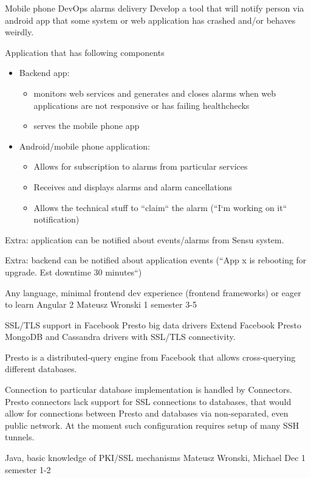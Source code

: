 \begin{project}
{Mobile phone DevOps alarms delivery}
{Develop a tool that will notify person via android app that some system or web application has crashed and/or behaves weirdly.} 
{
Application that has following components
\begin{itemize}
	\item Backend app:
		\begin{itemize}
			\item monitors web services and generates and closes alarms when web applications are not responsive or has failing healthchecks
			\item serves the mobile phone app
		\end{itemize}
	\item Android/mobile phone application:
		\begin{itemize}
			\item Allows for subscription to alarms from particular services
			\item Receives and displays alarms and alarm cancellations
			\item Allows the technical stuff to ``claim`` the alarm (``I`m working on it`` notification)
		\end{itemize}
\end{itemize}
\bigbreak
Extra: application can be notified about events/alarms from Sensu system.

Extra: backend can be notified about application events (``App x is rebooting for upgrade. Est downtime 30 minutes``)
}
{Any language, minimal frontend dev experience (frontend frameworks) or eager to learn Angular 2}
{Mateusz Wronski}
{1 semester}
{3-5}
\end{project}
\begin{project}
{SSL/TLS support in Facebook Presto big data drivers}
{Extend Facebook Presto MongoDB and Cassandra drivers with SSL/TLS connectivity.}
{
Presto is a distributed-query engine from Facebook that allows cross-querying different databases.

Connection to particular database implementation is handled by Connectors. Presto connectors lack support for SSL connections to databases, that would allow for connections between Presto and databases via non-separated, even public network. At the moment such configuration requires setup of many SSH tunnels.
}
{Java, basic knowledge of PKI/SSL mechanisms}
{Mateusz Wronski, Michael Dec}
{1 semester}
{1-2}
\end{project}
